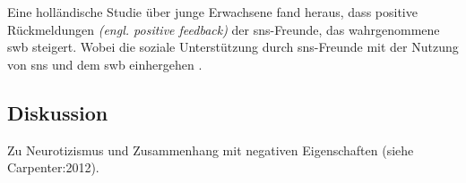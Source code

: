 Eine holländische Studie über junge Erwachsene fand heraus, dass positive Rückmeldungen \textit{(engl. positive feedback)} der \gls{sns}-Freunde, das wahrgenommene \gls{swb} steigert. Wobei die soziale Unterstützung durch \gls{sns}-Freunde mit der Nutzung von \gls{sns} und dem \gls{swb} einhergehen \cite{Valkenburg:2006}. 

\subsection{Diskussion}\label{subsec.traitsDiskussion}
Zu Neurotizismus und Zusammenhang mit negativen Eigenschaften (siehe Carpenter:2012).

